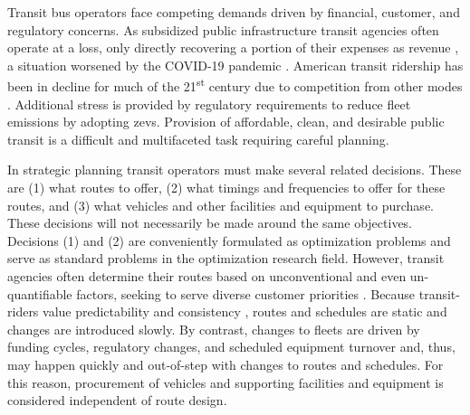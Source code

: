 Transit bus operators face competing demands driven by financial, customer, and regulatory concerns. As subsidized public infrastructure transit agencies often operate at a loss, only directly recovering a portion of their expenses as revenue \cite{Litman_2014_JPT, Taylor_2009_JPL}, a situation worsened by the COVID-19 pandemic \cite{Siddiq_2023_PWMP}. American transit ridership has been in decline for much of the 21\textsuperscript{st} century \cite{Wasserman_2022_JPT} due to competition from other modes \cite{Erhardt_2022_TRA, Pan_2022_POM}. Additional stress is provided by regulatory requirements to reduce fleet emissions \cite{Jeffers_2022_OSTI, CARB_2018_CARB, FTA_2022_FTA} by adopting \glspl{zev}. Provision of affordable, clean, and desirable public transit is a difficult and multifaceted task requiring careful planning.

In strategic planning transit operators must make several related decisions. These are (1) what routes to offer, (2) what timings and frequencies to offer for these routes, and (3) what vehicles and other facilities and equipment to purchase. These decisions will not necessarily be made around the same objectives. Decisions (1) and (2) are conveniently formulated as optimization problems and serve as standard problems in the optimization research field. However, transit agencies often determine their routes based on unconventional and even un-quantifiable factors, seeking to serve diverse customer priorities \cite{Mers_2024_TRR}. Because transit-riders value predictability and consistency \cite{Watkins_2011_TRA, Berrebi_2021_TRA}, routes and schedules are static and changes are introduced slowly. By contrast, changes to fleets are driven by funding cycles, regulatory changes, and scheduled equipment turnover and, thus, may happen quickly and out-of-step with changes to routes and schedules. For this reason, procurement of vehicles and supporting facilities and equipment is considered independent of route design.

